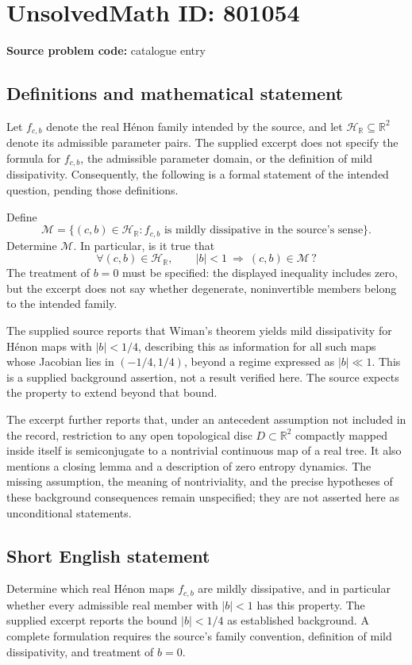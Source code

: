 \documentclass[11pt]{article}
\newcommand{\R}{\mathbb{R}}
\begin{document}
\section*{UnsolvedMath ID: 801054}
\textbf{Source problem code:} catalogue entry
\subsection{Definitions and mathematical statement}
Let \(f_{c,b}\) denote the real H\'enon family intended by the source, and let \(\mathcal H_{\R}\subseteq\R^2\) denote its admissible parameter pairs. The supplied excerpt does not specify the formula for \(f_{c,b}\), the admissible parameter domain, or the definition of mild dissipativity. Consequently, the following is a formal statement of the intended question, pending those definitions.

Define
\[
\mathcal M=\bigl\{(c,b)\in\mathcal H_{\R}: f_{c,b}\text{ is mildly dissipative in the source's sense}\bigr\}.
\]
Determine \(\mathcal M\). In particular, is it true that
\[
\forall (c,b)\in\mathcal H_{\R},\qquad |b|<1\ \Longrightarrow\ (c,b)\in\mathcal M\,?
\]
The treatment of \(b=0\) must be specified: the displayed inequality includes zero, but the excerpt does not say whether degenerate, noninvertible members belong to the intended family.

The supplied source reports that Wiman's theorem yields mild dissipativity for H\'enon maps with \(|b|<1/4\), describing this as information for all such maps whose Jacobian lies in \((-1/4,1/4)\), beyond a regime expressed as \(|b|\ll1\). This is a supplied background assertion, not a result verified here. The source expects the property to extend beyond that bound.

The excerpt further reports that, under an antecedent assumption not included in the record, restriction to any open topological disc \(D\subset\R^2\) compactly mapped inside itself is semiconjugate to a nontrivial continuous map of a real tree. It also mentions a closing lemma and a description of zero entropy dynamics. The missing assumption, the meaning of nontriviality, and the precise hypotheses of these background consequences remain unspecified; they are not asserted here as unconditional statements.
\subsection{Short English statement}
Determine which real H\'enon maps \(f_{c,b}\) are mildly dissipative, and in particular whether every admissible real member with \(|b|<1\) has this property. The supplied excerpt reports the bound \(|b|<1/4\) as established background. A complete formulation requires the source's family convention, definition of mild dissipativity, and treatment of \(b=0\).
\end{document}
